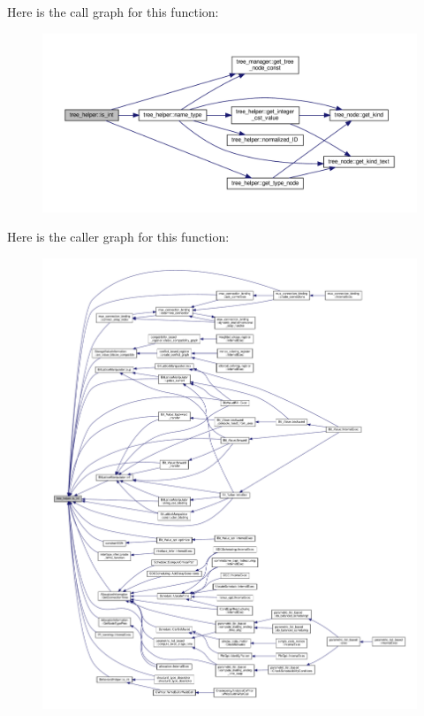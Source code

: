 Here is the call graph for this function\+:
\nopagebreak
\begin{figure}[H]
\begin{center}
\leavevmode
\includegraphics[width=350pt]{d7/d99/classtree__helper_a0e90b9e4f5363c7ff726cbeaa8cc8f53_cgraph}
\end{center}
\end{figure}
Here is the caller graph for this function\+:
\nopagebreak
\begin{figure}[H]
\begin{center}
\leavevmode
\includegraphics[width=350pt]{d7/d99/classtree__helper_a0e90b9e4f5363c7ff726cbeaa8cc8f53_icgraph}
\end{center}
\end{figure}
\mbox{\label{classtree__helper_a7ca2622f28872c5e2c61bde0bfe37610}} 
